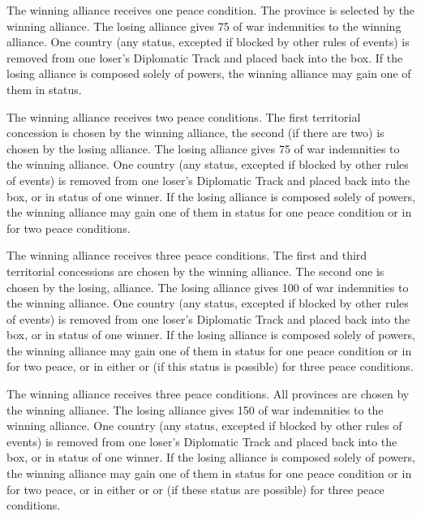  The winning alliance receives one peace
condition.
 The province is selected by the winning
alliance. 
\bparag[Indemnities] The losing alliance gives 75 \ducats of war indemnities
to the winning alliance.
 One country (any status, excepted if blocked
by other rules of events) is removed from one loser's Diplomatic Track and
placed back into the \Neutral box. If the losing alliance is composed solely
of \MIN powers, the winning alliance may gain one of them in \MR status. 

 The winning alliance receives two peace conditions.
 The first territorial concession is chosen by
the winning alliance, the second (if there are two) is chosen by the losing
alliance.
\bparag[Indemnities] The losing alliance gives 75 \ducats of war indemnities
to the winning alliance.
 One country (any status, excepted if blocked
by other rules of events) is removed from one loser's Diplomatic Track and
placed back into the \Neutral box, or in \MR status of one winner. If the
losing alliance is composed solely of \MIN powers, the winning alliance may
gain one of them in \MR status for one peace condition or in \AM for two peace
conditions.

 The winning alliance receives three peace
conditions.
 The first and third territorial concessions
are chosen by the winning alliance. The second one is chosen by the losing,
alliance.
\bparag[Indemnities] The losing alliance gives 100 \ducats of war indemnities
to the winning alliance.
 One country (any status, excepted if blocked
by other rules of events) is removed from one loser's Diplomatic Track and
placed back into the \Neutral box, or in \MR status of one winner. If the
losing alliance is composed solely of \MIN powers, the winning alliance may
gain one of them in \MR status for one peace condition or in \AM for two
peace, or in either \EG or \VASSAL (if this status is possible) for three
peace conditions.

 The winning alliance receives
three peace conditions.
 All provinces are chosen by the winning
alliance.
\bparag[Indemnities] The losing alliance gives 150 \ducats of war indemnities
to the winning alliance.
 One country (any status, excepted if blocked
by other rules of events) is removed from one loser's Diplomatic Track and
placed back into the \Neutral box, or in \MR status of one winner. If the
losing alliance is composed solely of \MIN powers, the winning alliance may
gain one of them in \MR status for one peace condition or in \AM for two
peace, or in either \EG or \VASSAL or \ANNEXION (if these status are possible)
for three peace conditions.

